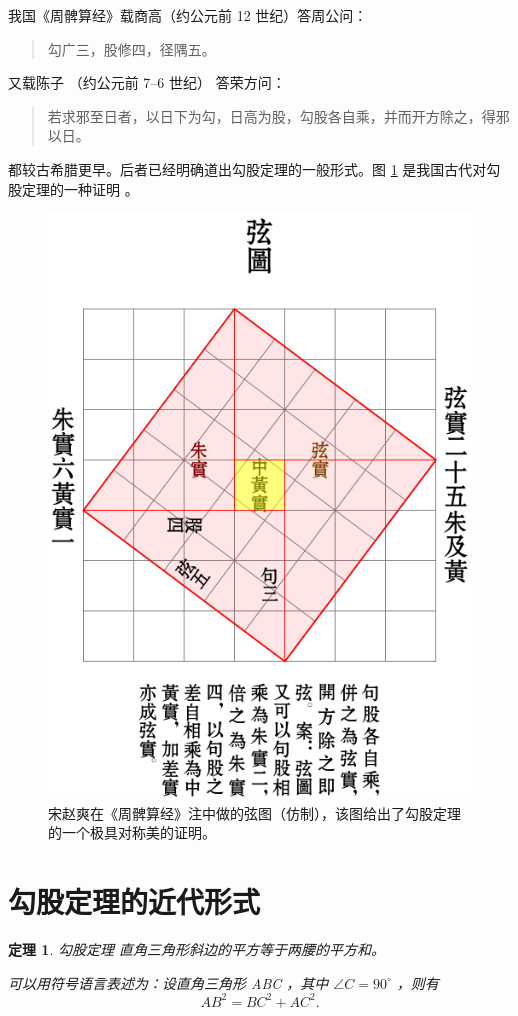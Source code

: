 \documentclass[UTF8]{ctexart}
\begin{document}
我国《周髀算经》载商高（约公元前 12 世纪）答周公问：
\begin{quote}
\kaishu
勾广三，股修四，径隅五。
\end{quote}
又载陈子 （约公元前 7--6 世纪） 答荣方问：
\begin{quote}
\kaishu
若求邪至日者，以日下为勾，日高为股，勾股各自乘，并而开方除之，得邪以日。
\end{quote}
都较古希腊更早。后者已经明确道出勾股定理的一般形式。图 \ref{fig:xiantu} 是我国古代对勾股定理的一种证明 \cite{quanjing}。
\begin{figure}[ht]
  \centering
  \includegraphics[scale=0.4]{xiantu.pdf}
  \caption{宋赵爽在《周髀算经》注中做的弦图（仿制），该图给出了勾股定理的一个极具对称美的证明。}
  \label{fig:xiantu}
\end{figure}


\section{勾股定理的近代形式}
\newtheorem{thm}{定理}
\begin{thm}{勾股定理}
直角三角形斜边的平方等于两腰的平方和。

可以用符号语言表述为：设直角三角形 ABC ，其中 $\angle C = 90^\circ$ ，则有
\begin{equation}\label{eq:gougu}
AB^2 = BC ^2 + AC^2.
\end{equation}
\end{thm}
\end{document}
